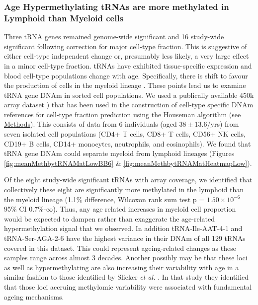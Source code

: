 \documentclass[]{book}
\begin{document}
\hypertarget{age-hypermethylating-trnas-are-more-methylated-in-lymphoid-than-myeloid-cells}{%
\subsubsection{Age Hypermethylating tRNAs are more methylated in Lymphoid than Myeloid cells}\label{age-hypermethylating-trnas-are-more-methylated-in-lymphoid-than-myeloid-cells}}

Three tRNA genes remained genome-wide significant and 16 study-wide significant following correction for major cell-type fraction.
This is suggestive of either cell-type independent change or, presumably less likely, a very large effect in a minor cell-type fraction.
tRNAs have exhibited tissue-specific expression \citep{Schmitt2014b, Dittmar2006, Sagi2016} and blood cell-type populations change with age.
Specifically, there is shift to favour the production of cells in the myeloid lineage \citep{Geiger2013}.
These points lead us to examine tRNA gene DNAm in sorted cell populations.
We used a publically available 450k array dataset \citep{Reinius2012}) that has been used in the construction of cell-type specific DNAm references for cell-type fraction prediction using the Houseman algorithm \citep{Houseman2012} (see \protect\hyperlink{sortedbloodmethods}{Methods}).
This consists of data from 6 individuals (aged \(38 \pm 13.6\)/yrs) from seven isolated cell populations (CD4+ T cells, CD8+ T cells, CD56+ NK cells, CD19+ B cells, CD14+ monocytes, neutrophils, and eosinophils).
We found that tRNA gene DNAm could separate myeloid from lymphoid lineages (Figures \ref{fig:meanMethbytRNAMatLowBB6} \& \ref{fig:meanMethbytRNAMatHeatmapLow}).

Of the eight study-wide significant tRNAs with array coverage, we identified that collectively these eight are significantly more methylated in the lymphoid than the myeloid lineage (1.1\% difference, Wilcoxon rank sum test p = \(1.50\times10^{-6}\) 95\% CI 0.7\%-\(\infty\)).
Thus, any age related increases in myeloid cell proportion would be expected to dampen rather than exaggerate the age-related hypermethylation signal that we observed.
In addition tRNA-Ile-AAT-4-1 and tRNA-Ser-AGA-2-6 have the highest variance in their DNAm of all 129 tRNAs covered in this dataset.
This could represent ageing-related changes as these samples range across almost 3 decades.
Another possibly may be that these loci as well as hypermethylating are also increasing their variability with age in a similar fashion to those identified by Slieker \emph{et al.} \citep{Slieker2016}.
In that study they identified that those loci accruing methylomic variability were associated with fundamental ageing mechanisms.
\end{document}
